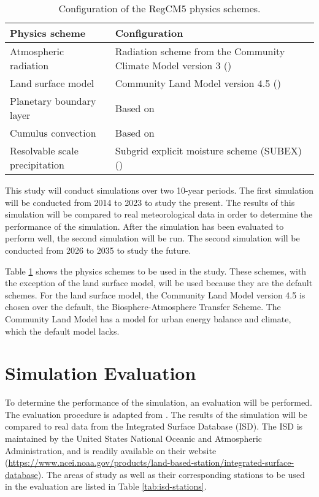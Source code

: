 	\begin{table}	
		\caption{Configuration of the RegCM5 physics schemes.}
		\label{tab:physics-schemes}
		\centering
		\begin{tabular}{p{2 in} p{2.75 in}}
			\hline \hline
			Physics scheme & Configuration\\
			\hline
			Atmospheric radiation & Radiation scheme from the Community Climate Model version 3 (\cite{Kiehl1996}) \\
			Land surface model & Community Land Model version 4.5 (\cite{Oleson2013})\\
			Planetary boundary layer & Based on \textcite{Holtslag1990}\\
			Cumulus convection & Based on \textcite{Emanuel1991}\\
			Resolvable scale precipitation & Subgrid explicit moisture scheme (SUBEX) (\cite{Pal2000})\\
			\hline
		\end{tabular}		
	\end{table}

	This study will conduct simulations over two 10-year periods.
	The first simulation will be conducted from 2014 to 2023 to study the present.
	The results of this simulation will be compared to real meteorological data in order to determine the performance of the simulation.
	After the simulation has been evaluated to perform well, the second simulation will be run.
	The second simulation will be conducted from 2026 to 2035 to study the future.
	
	Table \ref{tab:physics-schemes} shows the physics schemes to be used in the study.
	These schemes, with the exception of the land surface model, will be used because they are the default schemes. 
	For the land surface model, the Community Land Model version 4.5 is chosen over the default, the Biosphere-Atmosphere Transfer Scheme. 
	The Community Land Model has a model for urban energy balance and climate, which the default model lacks.
	
\section{Simulation Evaluation}
	To determine the performance of the simulation, an evaluation will be performed. The evaluation procedure is adapted from \textcite{Bilang2022}.
	The results of the simulation will be compared to real data from the Integrated Surface Database (ISD).
	The ISD is maintained by the United States National Oceanic and Atmospheric Administration, and is readily available on their website 
		(\url{https://www.ncei.noaa.gov/products/land-based-station/integrated-surface-database}).
	The areas of study as well as their corresponding stations to be used in the evaluation are listed in Table \ref{tab:isd-stations}.

